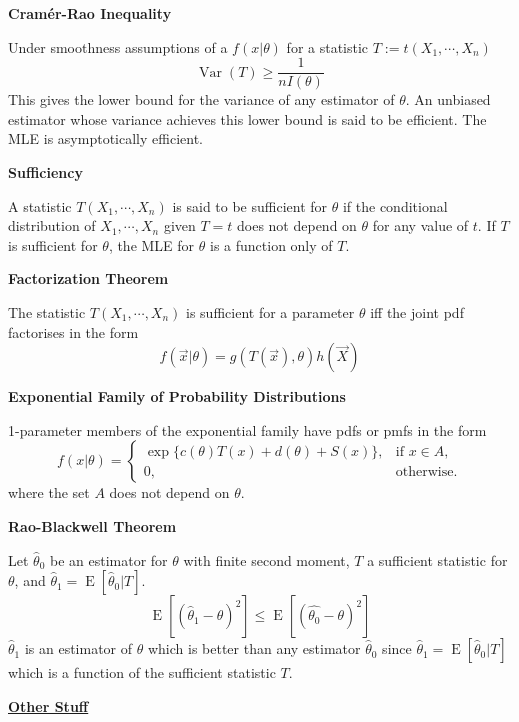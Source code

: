 \documentclass[a4paper]{article}
\newcommand{\heading}[1]{{\small\underline{\textbf{#1}}}\smallskip}
\newcommand{\subheading}[1]{{\scriptsize\textbf{#1}}}
\renewenvironment{section}[1]
  {
    \subheading{#1}\smallskip

  }{
    \medskip
  }
\newcommand{\expectation}[1]{\operatorname{E}[#1]}
\DeclareMathOperator{\Var}{Var}
\begin{document}
\begin{multicols*}{4}
\begin{section}{Cram\'er-Rao Inequality}
  Under smoothness assumptions of a $f(x|\theta)$ for a statistic $T:=t(X_1,
  \cdots, X_n)$
  $$\Var(T) \geq \frac{1}{nI(\theta)}$$
  This gives the lower bound for the variance of any estimator of $\theta$. An
  unbiased estimator whose variance achieves this lower bound is said to be
  efficient. The MLE is asymptotically efficient.
\end{section}

\begin{section}{Sufficiency}
  A statistic $T(X_1, \cdots, X_n)$ is said to be sufficient for $\theta$ if the
  conditional distribution of $X_1, \cdots, X_n$ given $T=t$ does not depend on
  $\theta$ for any value of $t$. If $T$ is sufficient for $\theta$, the MLE for
  $\theta$ is a function only of $T$.
\end{section}

\begin{section}{Factorization Theorem}
  The statistic $T(X_1, \cdots, X_n)$ is sufficient for a parameter $\theta$ iff
  the joint pdf factorises in the form
  $$f(\vec{x}|\theta) = g(T(\vec{x}), \theta)h(\vec{X})$$
\end{section}

\begin{section}{Exponential Family of Probability Distributions}
  1-parameter members of the exponential family have pdfs or pmfs in the form
  $$f(x|\theta) = \begin{cases}
      \exp\{c(\theta)T(x)+d(\theta)+S(x)\}, & \text{if } x \in A, \\
      0, & \text{otherwise.}
  \end{cases}$$
  where the set $A$ does not depend on $\theta$.
\end{section}

\begin{section}{Rao-Blackwell Theorem}
  Let $\hat{\theta}_0$ be an estimator for $\theta$ with finite second moment,
  $T$ a sufficient statistic for $\theta$, and $\hat{\theta}_1 =
  \expectation{\hat{\theta}_0|T}$.
  $$\expectation{(\hat{\theta}_1-\theta)^2} \leq
    \expectation{(\hat{\theta_0}-\theta)^2}$$
  $\hat{\theta}_1$ is an estimator of $\theta$ which is better than any
  estimator $\hat{\theta}_0$ since
  $\hat{\theta}_1=\expectation{\hat{\theta}_0|T}$ which is a function of the
  sufficient statistic $T$.
\end{section}

\heading{Other Stuff}


\end{multicols*}
\end{document}
